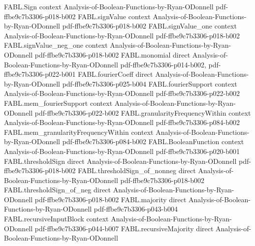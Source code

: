 \begin{theorem}
\label{FABL.recursiveMajority_unanimous}
\leanok
{}
\proofstep
  {FABL.Sign}
  {context}
  {Analysis-of-Boolean-Functions-by-Ryan-ODonnell}
  {pdf-ffbe9c7b3306-p018-b002}
\proofstep
  {FABL.signValue}
  {context}
  {Analysis-of-Boolean-Functions-by-Ryan-ODonnell}
  {pdf-ffbe9c7b3306-p018-b002}
\proofstep
  {FABL.signValue_one}
  {context}
  {Analysis-of-Boolean-Functions-by-Ryan-ODonnell}
  {pdf-ffbe9c7b3306-p018-b002}
\proofstep
  {FABL.signValue_neg_one}
  {context}
  {Analysis-of-Boolean-Functions-by-Ryan-ODonnell}
  {pdf-ffbe9c7b3306-p018-b002}
\proofstep
  {FABL.monomial}
  {direct}
  {Analysis-of-Boolean-Functions-by-Ryan-ODonnell}
  {pdf-ffbe9c7b3306-p014-b002,
    pdf-ffbe9c7b3306-p022-b001}
\proofstep
  {FABL.fourierCoeff}
  {direct}
  {Analysis-of-Boolean-Functions-by-Ryan-ODonnell}
  {pdf-ffbe9c7b3306-p025-b004}
\proofstep
  {FABL.fourierSupport}
  {context}
  {Analysis-of-Boolean-Functions-by-Ryan-ODonnell}
  {pdf-ffbe9c7b3306-p022-b002}
\proofstep
  {FABL.mem_fourierSupport}
  {context}
  {Analysis-of-Boolean-Functions-by-Ryan-ODonnell}
  {pdf-ffbe9c7b3306-p022-b002}
\proofstep
  {FABL.granularityFrequencyWithin}
  {context}
  {Analysis-of-Boolean-Functions-by-Ryan-ODonnell}
  {pdf-ffbe9c7b3306-p084-b002}
\proofstep
  {FABL.mem_granularityFrequencyWithin}
  {context}
  {Analysis-of-Boolean-Functions-by-Ryan-ODonnell}
  {pdf-ffbe9c7b3306-p084-b002}
\proofstep
  {FABL.BooleanFunction}
  {context}
  {Analysis-of-Boolean-Functions-by-Ryan-ODonnell}
  {pdf-ffbe9c7b3306-p020-b001}
\proofstep
  {FABL.thresholdSign}
  {direct}
  {Analysis-of-Boolean-Functions-by-Ryan-ODonnell}
  {pdf-ffbe9c7b3306-p018-b002}
\proofstep
  {FABL.thresholdSign_of_nonneg}
  {direct}
  {Analysis-of-Boolean-Functions-by-Ryan-ODonnell}
  {pdf-ffbe9c7b3306-p018-b002}
\proofstep
  {FABL.thresholdSign_of_neg}
  {direct}
  {Analysis-of-Boolean-Functions-by-Ryan-ODonnell}
  {pdf-ffbe9c7b3306-p018-b002}
\proofstep
  {FABL.majority}
  {direct}
  {Analysis-of-Boolean-Functions-by-Ryan-ODonnell}
  {pdf-ffbe9c7b3306-p043-b004}
\proofstep
  {FABL.recursiveInputBlock}
  {context}
  {Analysis-of-Boolean-Functions-by-Ryan-ODonnell}
  {pdf-ffbe9c7b3306-p044-b007}
\proofstep
  {FABL.recursiveMajority}
  {direct}
  {Analysis-of-Boolean-Functions-by-Ryan-ODonnell}

\end{theorem}
